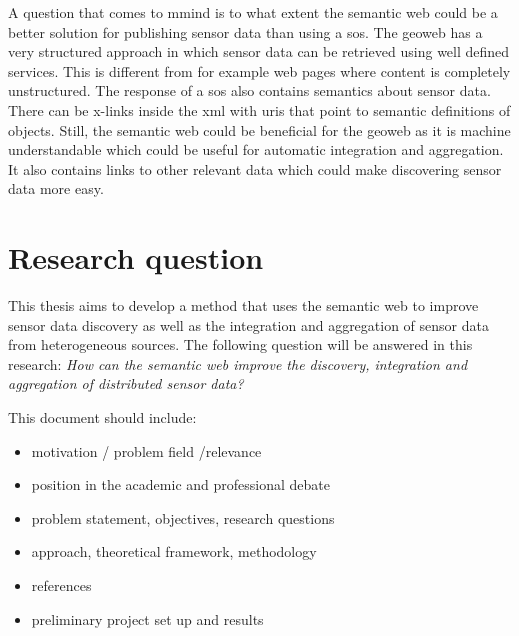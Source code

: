 A question that comes to mmind is to what extent the semantic web could be a better solution for publishing sensor data than using a \ac{sos}. The geoweb has a very structured approach in which sensor data can be retrieved using well defined services. This is different from for example web pages where content is completely unstructured. The response of a \ac{sos} also contains semantics about sensor data. There can be x-links inside the \ac{xml} with \ac{uri}s that point to semantic definitions of objects. Still, the semantic web could be beneficial for the geoweb as it is machine understandable which could be useful for automatic integration and aggregation. It also contains links to other relevant data which could make discovering sensor data more easy.   

\section{Research question}
This thesis aims to develop a method that uses the semantic web to improve sensor data discovery as well as the integration and aggregation of sensor data from heterogeneous sources. The following question will be answered in this research:   
\textit{How can the semantic web improve the discovery, integration and aggregation of distributed sensor data?} 












































\iffalse

This document should include:

\begin{itemize} 
\item motivation / problem field /relevance

\item position in the academic and professional debate

\item problem statement, objectives, research questions

\item approach, theoretical framework, methodology

\item references

\item preliminary project set up and results

\end{itemize}


